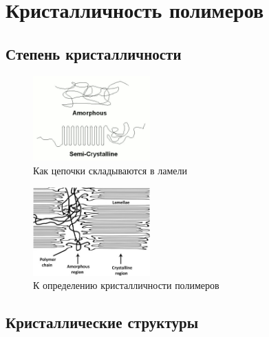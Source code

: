 
	\section{Кристалличность полимеров}


\subsection{Степень кристалличности}
	
	\begin{figure} 
\vspace{-20pt}
  \begin{center}
    \includegraphics[width=0.4\textwidth]{fig/crystal-1.png}
    \caption{Как цепочки складываются в ламели}
    \label{fig:crystal-1}
  \end{center}
  \vspace{-20pt}
  \vspace{1pt}
\end{figure}
	
	
	\begin{figure} 
\vspace{-20pt}
  \begin{center}
    \includegraphics[width=0.4\textwidth]{fig/crystal-2.jpg}
    \caption{К определению кристалличности полимеров}
    \label{fig:crystal-2}
  \end{center}
  \vspace{-20pt}
  \vspace{1pt}
\end{figure}	
	
\subsection{Кристаллические структуры}

